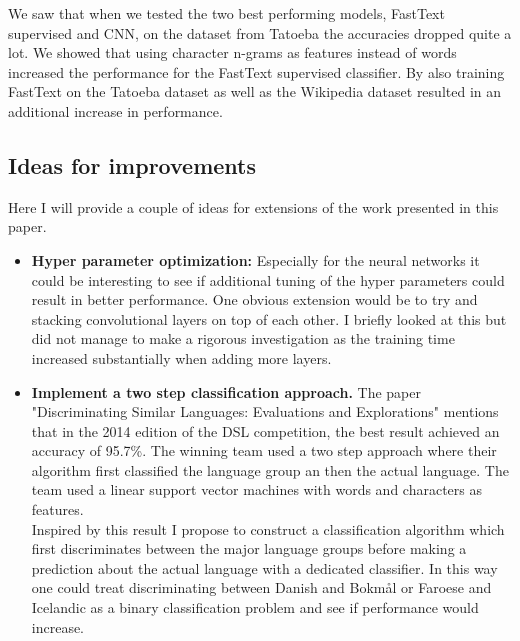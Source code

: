 We saw that when we tested the two best performing models, FastText supervised and CNN, on the dataset from Tatoeba the accuracies dropped quite a lot. We showed that using character n-grams as features instead of words increased the performance for the FastText supervised classifier. By also training FastText on the Tatoeba dataset as well as the Wikipedia dataset resulted in an additional increase in performance.


\subsection{Ideas for improvements}
Here I will provide a couple of ideas for extensions of the work presented in this paper.
\begin{itemize}
  \item \textbf{Hyper parameter optimization:}
  Especially for the neural networks it could be interesting to see if additional tuning of the hyper parameters could result in better performance. One obvious extension would be to try and stacking convolutional layers on top of each other. I briefly looked at this but did not manage to make a rigorous investigation as the training time increased substantially when adding more layers.
  \item \textbf{Implement a two step classification approach.}
  The paper "Discriminating Similar Languages:
  Evaluations and Explorations" \cite{DSLEvaluation} mentions that in the 2014 edition of the DSL competition, the best result achieved an accuracy of 95.7\%. The winning team used a two step approach where their algorithm first classified the language group an then the actual language. The team used a linear support vector machines with words and characters as features.\\
  Inspired by this result I propose to construct a classification algorithm which first discriminates between the major language groups before making a prediction about the actual language with a dedicated classifier. In this way one could treat discriminating between Danish and Bokmål or Faroese and Icelandic as a binary classification problem and see if performance would increase.\\
\end{itemize}




%
